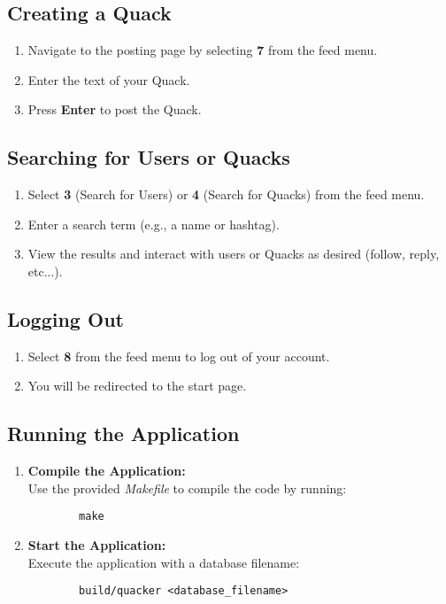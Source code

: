 \documentclass[letterpaper, 11pt]{article}
\begin{document}
\subsection*{Creating a Quack}
\begin{enumerate}
    \item Navigate to the posting page by selecting \textbf{7} from the feed menu.
    \item Enter the text of your Quack.
    \item Press \textbf{Enter} to post the Quack.
\end{enumerate}

\subsection*{Searching for Users or Quacks}
\begin{enumerate}
    \item Select \textbf{3} (Search for Users) or \textbf{4} (Search for Quacks) from the feed menu.
    \item Enter a search term (e.g., a name or hashtag).
    \item View the results and interact with users or Quacks as desired (follow, reply, etc...).
\end{enumerate}

\subsection*{Logging Out}
\begin{enumerate}
    \item Select \textbf{8} from the feed menu to log out of your account.
    \item You will be redirected to the start page.
\end{enumerate}

  \subsection*{Running the Application}
	\begin{enumerate}
		\item \textbf{Compile the Application:} \\
		Use the provided \textit{Makefile} to compile the code by running:
		\begin{verbatim}
		make
		\end{verbatim}
		\item \textbf{Start the Application:} \\
		Execute the application with a database filename:
		\begin{verbatim}
		build/quacker <database_filename>
		\end{verbatim}
	\end{enumerate}
\end{document}
